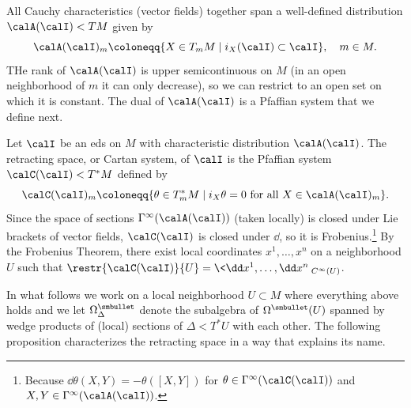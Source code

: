All Cauchy characteristics (vector fields) together span a well-defined distribution $\calA(\calI)< TM$ given by 
\[\calA(\calI)_m\coloneqq \{X\in T_mM\mid i_X(\calI)\subset \calI\},\quad m\in M.\]
THe rank of $\calA(\calI)$ is upper semicontinuous on $M$ (in an open neighborhood of $m$ it can only decrease), so we can restrict to an open set on which it is constant. The dual of $\calA(\calI)$ is a Pfaffian system that we define next.

\begin{defn}
    Let $\calI$ be an \gls{eds} on $M$ with characteristic distribution $\calA(\calI)$. The retracting space, or Cartan system, of $\calI$ is the Pfaffian system $\calC(\calI)<T^\ast M$ defined by 
    \[\calC(\calI)_m\coloneqq \{\theta\in T^\ast_m M\mid i_X\theta=0 \text{ for all }X\in \calA(\calI)_m\}.\]
    Since the space of sections $\Gamma^\infty(\calA(\calI))$ (taken locally) is closed under Lie brackets of vector fields, $\calC(\calI)$ is closed under $\dd$, so it is Frobenius.\footnote{Because $\dd\theta(X,Y)=-\theta([X,Y])$ for $\theta\in\Gamma^\infty(\calC(\calI))$ and $X,Y\in\Gamma^\infty(\calA(\calI))$.} By the Frobenius Theorem, there exist local coordinates $x^1,\ldots,x^n$ on a neighborhood $U$ such that $\restr{\calC(\calI)}{U}=\<\dd x^1,\ldots,\dd x^n\>_{C^\infty(U)}$.
\end{defn}

In what follows we work on a local neighborhood $U\subset M$ where everything above holds and we let $\Omega^{\smbullet}_\Delta$ denote the subalgebra of $\Omega^{\smbullet}(U)$ spanned by wedge products of (local) sections of $\Delta<T^\ast U$ with each other. The following proposition characterizes the retracting space in a way that explains its name.

